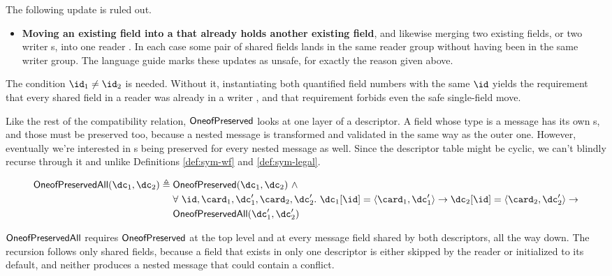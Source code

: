 The following update is ruled out.

\begin{itemize}
\item \textbf{Moving an existing field into a \Oneof{} that already holds
  another existing field}, and likewise merging two existing fields, or two
  writer \Oneof{}s, into one reader \Oneof{}. In each case some pair of shared
  fields lands in the same reader group without having been in the same writer
  group. The language guide marks these updates as unsafe, for exactly the
  reason given above.
\end{itemize}

The condition $\id_1 \neq \id_2$ is needed. Without it, instantiating both
quantified field numbers with the same $\id$ yields the requirement that every
shared field in a reader \Oneof{} was already in a writer \Oneof{}, and that
requirement forbids even the safe single-field move.

Like the rest of the compatibility relation, $\mathsf{OneofPreserved}$ looks at one layer of
a descriptor. A field whose type is a message has its own \Oneof{}s, and those
must be preserved too, because a nested message is transformed and validated in
the same way as the outer one. However, eventually we're interested in \Oneof{}s
being preserved for every nested message as well. Since the descriptor table
might be cyclic, we can't blindly recurse through it and unlike Definitions
\ref{def:sym-wf} and \ref{def:sym-legal}.

\vspace{1em}
\begin{definition}\label{def:oneof-pres-all}
  \[ \begin{aligned}
    \oneofpresall(\dc_1, \dc_2) \triangleq{}
      & \oneofpres(\dc_1, \dc_2)\ \wedge \\
      & \forall\ \id, \card_1, \dc_1', \card_2, \dc_2'.\
        \dc_1[\id] = \field{\card_1}{\dc_1'} \rightarrow
        \dc_2[\id] = \field{\card_2}{\dc_2'} \rightarrow \\
      & \oneofpresall(\dc_1', \dc_2')
  \end{aligned} \]
\end{definition}

$\mathsf{OneofPreservedAll}$ requires $\mathsf{OneofPreserved}$ at the top level and at every message
field shared by both descriptors, all the way down. The recursion follows only
shared fields, because a field that exists in only one descriptor is either
skipped by the reader or initialized to its default, and neither produces a
nested message that could contain a conflict.


